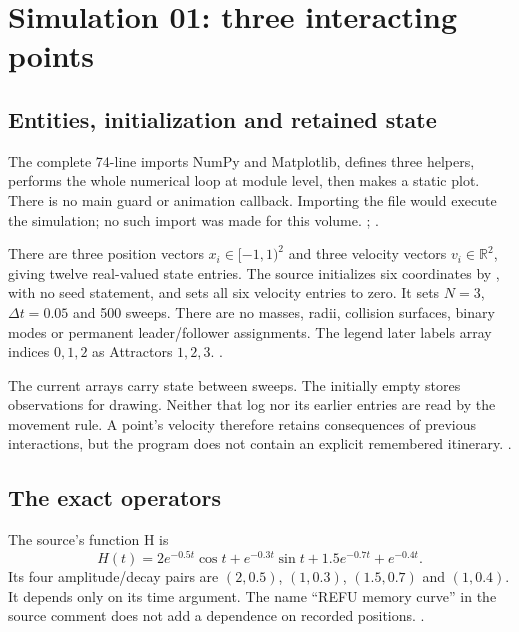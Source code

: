 \chapter{Simulation 01: three interacting points}\label{ch:s01}

\section{Entities, initialization and retained state}
The complete 74-line  imports NumPy and
Matplotlib, defines three helpers, performs the whole numerical loop at
module level, then makes a static plot. There is no main guard or animation
callback. Importing the file would execute the simulation; no such import
was made for this volume. ; \cite{construction01}.

There are three position vectors $x_i\in[-1,1)^2$ and three velocity vectors
$v_i\in\mathbb R^2$, giving twelve real-valued state entries. The source
initializes six coordinates by ,
with no seed statement, and sets all six velocity entries to zero.
It sets $N=3$, $\Delta t=0.05$ and 500 sweeps.
There are no masses, radii, collision surfaces, binary modes or permanent
leader/follower assignments. The legend later labels array indices $0,1,2$
as Attractors $1,2,3$. . 

The current arrays carry state between sweeps. The initially empty
 stores observations for drawing. Neither that log
nor its earlier entries are read by the movement rule. A point's velocity
therefore retains consequences of previous interactions, but the program
does not contain an explicit remembered itinerary.
. 

\section{The exact operators}
The source's function H is
\begin{equation}\label{eq:H}
H(t)=2e^{-0.5t}\cos t+e^{-0.3t}\sin t
      +1.5e^{-0.7t}+e^{-0.4t}.
\end{equation}
Its four amplitude/decay pairs are $(2,0.5)$, $(1,0.3)$, $(1.5,0.7)$
and $(1,0.4)$. It depends only on its time argument. The name “REFU memory
curve” in the source comment does not add a dependence on recorded
positions. . 

